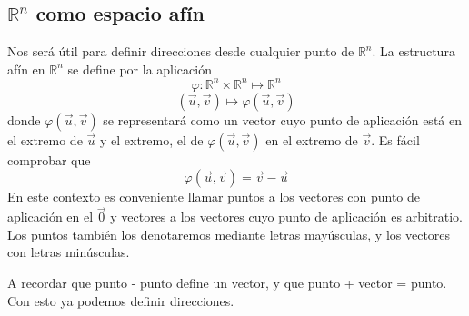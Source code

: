 \documentclass{../Calculo.tex}
\begin{document}
\subsection{$\mathbb{R}^{n}$ como espacio afín}
Nos será útil para definir direcciones desde cualquier punto de $\mathbb{R}^{n}$.
La estructura afín en $\mathbb{R}^{n}$ se define por la aplicación
\[
	\varphi: \mathbb{R}^{n} \times \mathbb{R}^{n} \mapsto \mathbb{R}^{n}
\]
\[
	(\vec{u}, \vec{v}) \mapsto \varphi(\vec{u}, \vec{v})
\]
donde $\varphi(\vec{u}, \vec{v})$ se representará como un vector cuyo punto
de aplicación está en el extremo de $\vec{u}$ y el extremo, el de $\varphi(
\vec{u}, \vec{v})$ en el extremo de $\vec{v}$. Es fácil comprobar que
\[
	\varphi(\vec{u},\vec{v}) = \vec{v} - \vec{u}
\]
En este contexto es conveniente llamar puntos a los vectores con punto de
aplicación en el $\vec{0}$ y vectores a los vectores cuyo punto de aplicación
es arbitratio. Los puntos también los denotaremos mediante letras mayúsculas,
y los vectores con letras minúsculas.
\begin{center}
	


\end{center}
A recordar que punto - punto define un vector, y que punto + vector = punto.
Con esto ya podemos definir direcciones.
\end{document}
